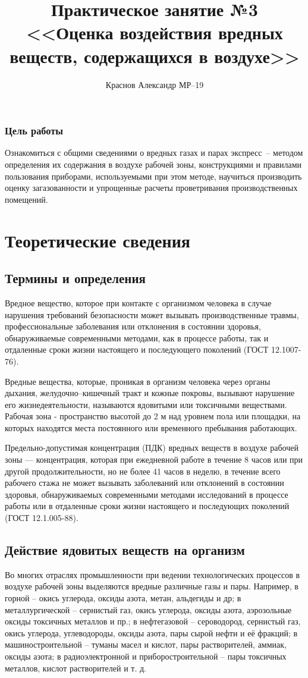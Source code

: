 \documentclass[a5paper, 12dd, twoside]{article}
\title{Практическое занятие №3\\<<Оценка воздействия вредных веществ, содержащихся в воздухе>>}
\author{Краснов Александр МР--19}
\begin{document}
\maketitle
\tableofcontents
\clearpage

\subsubsection*{Цель работы}
Ознакомиться с общими сведениями о вредных газах и парах экспресс~-- методом определения их содержания в воздухе рабочей зоны, конструкциями и правилами пользования приборами, используемыми при этом методе, научиться производить оценку загазованности и упрощенные расчеты проветривания производственных помещений.

\section{Теоретические сведения}
\subsection{Термины и определения}
Вредное вещество, которое при контакте с организмом человека в случае нарушения требований безопасности может вызывать производственные травмы, профессиональные заболевания или отклонения в состоянии здоровья, обнаруживаемые современными методами, как в процессе работы, так и отдаленные сроки жизни настоящего и последующего поколений (ГОСТ 12.1007-76).

Вредные вещества, которые, проникая в организм человека через органы дыхания, желудочно--кишечный тракт и кожные покровы, вызывают нарушение его жизнедеятельности, называются ядовитыми или токсичными веществами. Рабочая зона - пространство высотой до 2 м над уровнем пола или площадки, на которых находятся места постоянного или временного пребывания работающих.

Предельно-допустимая концентрация (ПДК) вредных веществ в воздухе рабочей зоны --- концентрация, которая при ежедневной работе в течение 8 часов или при другой продолжительности, но не более 41 часов в неделю, в течение всего рабочего стажа не может вызывать заболеваний или отклонений в состоянии здоровья, обнаруживаемых современными методами исследований в процессе работы или в отдаленные сроки жизни настоящего и последующих поколений (ГОСТ 12.1.005-88).

\subsection{Действие ядовитых веществ на организм}
Во многих отраслях промышленности при ведении технологических процессов в воздухе рабочей зоны выделяются вредные различные газы и пары. Например, в горной -- окись углерода, оксиды азота, метан, альдегиды и др; в металлургической -- сернистый газ, окись углерода, оксиды азота, аэрозольные оксиды токсичных металлов и пр.; в нефтегазовой -- сероводород, сернистый газ, окись углерода, углеводороды, оксиды азота, пары сырой нефти и её фракций; в машиностроительной -- туманы масел и кислот, пары растворителей, аммиак, оксиды азота; в радиоэлектронной и приборостроительной -- пары токсичных металлов, кислот растворителей и т. д.
\end{document}
